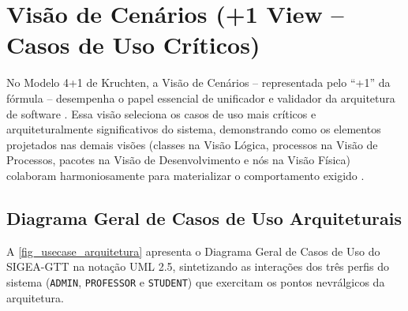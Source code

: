 \chapter{Visão de Cenários (+1 View -- Casos de Uso Críticos)}
\label{cap_visao_cenarios}

No Modelo 4+1 de Kruchten, a Visão de Cenários -- representada pelo ``+1'' da fórmula -- desempenha o papel essencial de unificador e validador da arquitetura de software \cite{kruchten1995}. Essa visão seleciona os casos de uso mais críticos e arquiteturalmente significativos do sistema, demonstrando como os elementos projetados nas demais visões (classes na Visão Lógica, processos na Visão de Processos, pacotes na Visão de Desenvolvimento e nós na Visão Física) colaboram harmoniosamente para materializar o comportamento exigido \cite{bass2021,pressman2021}.

\section{Diagrama Geral de Casos de Uso Arquiteturais}
\label{sec_diagrama_casos_uso_arq}

A \autoref{fig_usecase_arquitetura} apresenta o Diagrama Geral de Casos de Uso do SIGEA-GTT na notação UML 2.5, sintetizando as interações dos três perfis do sistema (\texttt{ADMIN}, \texttt{PROFESSOR} e \texttt{STUDENT}) que exercitam os pontos nevrálgicos da arquitetura.

